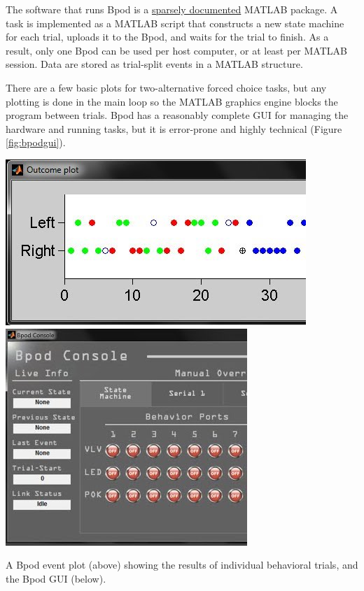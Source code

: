 The software that runs Bpod is a \href{https://sites.google.com/site/bpoddocumentation/bpod-user-guide/function-reference-beta}{sparsely documented} MATLAB package. A task is implemented as a MATLAB script that constructs a new state machine for each trial, uploads it to the Bpod, and waits for the trial to finish. As a result, only one Bpod can be used per host computer, or at least per MATLAB session. Data are stored as trial-split events in a MATLAB structure.

There are a few basic plots for two-alternative forced choice tasks, but any plotting is done in the main loop so the MATLAB graphics engine blocks the program between trials. Bpod has a reasonably complete GUI for managing the hardware and running tasks, but it is error-prone and highly technical (Figure \ref{fig:bpodgui}).

\begin{marginfigure}
\noindent\includegraphics[]{figures/side_11_bplot.jpg}
\includegraphics[]{figures/Bconsole.jpg}
\caption{A Bpod event plot (above) showing the results of individual behavioral trials, and the Bpod GUI (below).} 
\label{fig:bpodgui}
\end{marginfigure}



